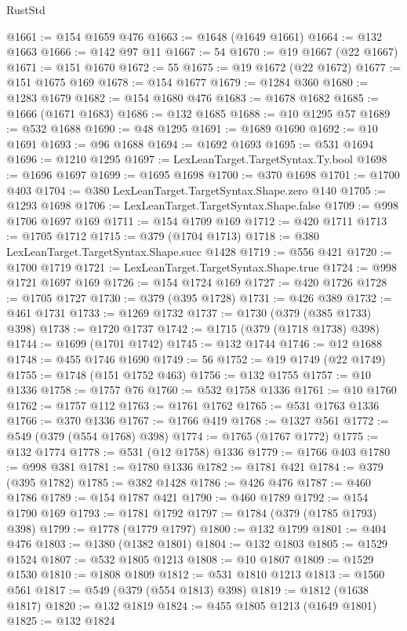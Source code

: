 \begin{lexlean}{RustStd}
\begin{coremodule}
{\begin{coremodule}
{{{{{{{{{{{{{{{{{{{{{{{{{{{{{{{{{{{{{{{{{{{{{{{{{{{{{{{{{{{{{{{{{{{{{{{{{{{{{{{{@1661 := @154 @1659 @476
@1663 := @1648 (@1649 @1661)
@1664 := @132 @1663
@1666 := @142 @97 @11
@1667 := 54
@1670 := @19 @1667 (@22 @1667)
@1671 := @151 @1670
@1672 := 55
@1675 := @19 @1672 (@22 @1672)
@1677 := @151 @1675 @169
@1678 := @154 @1677
@1679 := @1284 @360
@1680 := @1283 @1679
@1682 := @154 @1680 @476
@1683 := @1678 @1682
@1685 := @1666 (@1671 @1683)
@1686 := @132 @1685
@1688 := @10 @1295 @57
@1689 := @532 @1688
@1690 := @48 @1295
@1691 := @1689 @1690
@1692 := @10 @1691
@1693 := @96 @1688
@1694 := @1692 @1693
@1695 := @531 @1694
@1696 := @1210 @1295
@1697 := LexLeanTarget.TargetSyntax.Ty.bool
@1698 := @1696 @1697
@1699 := @1695 @1698
@1700 := @370 @1698
@1701 := @1700 @403
@1704 := @380 LexLeanTarget.TargetSyntax.Shape.zero @140
@1705 := @1293 @1698
@1706 := LexLeanTarget.TargetSyntax.Shape.false
@1709 := @998 @1706 @1697 @169
@1711 := @154 @1709 @169
@1712 := @420 @1711
@1713 := @1705 @1712
@1715 := @379 (@1704 @1713)
@1718 := @380 LexLeanTarget.TargetSyntax.Shape.succ @1428
@1719 := @556 @421
@1720 := @1700 @1719
@1721 := LexLeanTarget.TargetSyntax.Shape.true
@1724 := @998 @1721 @1697 @169
@1726 := @154 @1724 @169
@1727 := @420 @1726
@1728 := @1705 @1727
@1730 := @379 (@395 @1728)
@1731 := @426 @389
@1732 := @461 @1731
@1733 := @1269 @1732
@1737 := @1730 (@379 (@385 @1733) @398)
@1738 := @1720 @1737
@1742 := @1715 (@379 (@1718 @1738) @398)
@1744 := @1699 (@1701 @1742)
@1745 := @132 @1744
@1746 := @12 @1688
@1748 := @455 @1746 @1690
@1749 := 56
@1752 := @19 @1749 (@22 @1749)
@1755 := @1748 (@151 @1752 @463)
@1756 := @132 @1755
@1757 := @10 @1336
@1758 := @1757 @76
@1760 := @532 @1758 @1336
@1761 := @10 @1760
@1762 := @1757 @112
@1763 := @1761 @1762
@1765 := @531 @1763 @1336
@1766 := @370 @1336
@1767 := @1766 @419
@1768 := @1327 @561
@1772 := @549 (@379 (@554 @1768) @398)
@1774 := @1765 (@1767 @1772)
@1775 := @132 @1774
@1778 := @531 (@12 @1758) @1336
@1779 := @1766 @403
@1780 := @998 @381
@1781 := @1780 @1336
@1782 := @1781 @421
@1784 := @379 (@395 @1782)
@1785 := @382 @1428
@1786 := @426 @476
@1787 := @460 @1786
@1789 := @154 @1787 @421
@1790 := @460 @1789
@1792 := @154 @1790 @169
@1793 := @1781 @1792
@1797 := @1784 (@379 (@1785 @1793) @398)
@1799 := @1778 (@1779 @1797)
@1800 := @132 @1799
@1801 := @404 @476
@1803 := @1380 (@1382 @1801)
@1804 := @132 @1803
@1805 := @1529 @1524
@1807 := @532 @1805 @1213
@1808 := @10 @1807
@1809 := @1529 @1530
@1810 := @1808 @1809
@1812 := @531 @1810 @1213
@1813 := @1560 @561
@1817 := @549 (@379 (@554 @1813) @398)
@1819 := @1812 (@1638 @1817)
@1820 := @132 @1819
@1824 := @455 @1805 @1213 (@1649 @1801)
@1825 := @132 @1824
}}}}}}}}}}}}}}}}}}}}}}}}}}}}}}}}}}}}}}}}}}}}}}}}}}}}}}}}}}}}}}}}}}}}}}}}}}}}}}}}
\end{coremodule}}
\end{coremodule}
\end{lexlean}
